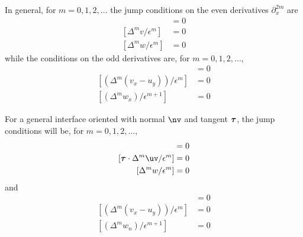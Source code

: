 In general, for $m=0,1,2,\ldots$ the jump conditions on the even derivatives $\partial_x^{2m}$ are
\begin{align}
     [ \Delta^m u /\epsilon^{m-1} ] &=0  \\
     [ \Delta^m v/\epsilon^m] &= 0  \\
     [ \Delta^m w/\epsilon^m] &= 0  
\end{align}
while the conditions on the odd derivatives are, for $m=0,1,2,\ldots$,
\begin{align}
     [ \Delta^m (u_x + v_y) ] &=0 \\
     [ (\Delta^m (v_x - u_y))/\epsilon^m ] &= 0  \\
     [ (\Delta^m w_{x})/\epsilon^{m+1} ] & = 0 
\end{align}


For a general interface oriented with normal $\nv$ and tangent $\boldsymbol{\tau}$, 
the jump conditions will be, for $m=0,1,2,\ldots$,
\begin{align}
     [ \nv\cdot\Delta^m \uv /\epsilon^{m-1} ] &=0  \\
     [ \tauv\cdot\Delta^m \uv/\epsilon^m] &= 0  \\
     [ \Delta^m w/\epsilon^m] &= 0  
\end{align}
and 
\begin{align}
     [ \Delta^m(u_x + v_y) ] &=0 \\
     [ (\Delta^m (v_x - u_y))/\epsilon^m ] &= 0  \\
     [ (\Delta^m w_{n})/\epsilon^{m+1} ] & = 0 
\end{align}

\newcommand{\curl}{\grad\times}

\clearpage
